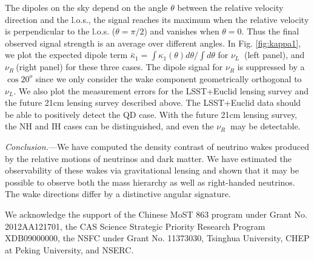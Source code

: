 \documentclass[aps,prl,twocolumn,showpacs,superscriptaddress,groupedaddress,nofootinbib]{revtex4}  %
\newcommand{\nur}{\ensuremath{{\nu_R~}}}
\newcommand{\nul}{\ensuremath{{\nu_L~}}}
\begin{document}
The dipoles on the sky depend on the angle $\theta$ between the relative
velocity direction and the l.o.s., the signal reaches its maximum when 
the relative velocity is perpendicular to the l.o.s. ($\theta=\pi/2$) and 
vanishes when $\theta=0$.
Thus the final observed signal strength is 
an average over different angles.
In Fig. \ref{fig:kappa1}, we plot the expected 
dipole term $\bar{\kappa}_1=\int\kappa_1(\theta)d\theta/\int d\theta$ for  \nul 
(left panel),  and \nur (right panel) for these three cases.
The dipole signal for $\nu_R$ is suppressed by a $\cos 20^o$ since we
only consider the wake component geometrically orthogonal to $\nu_L$.
We also plot the measurement errors for the
LSST+Euclid lensing survey and the future 21cm lensing survey described
above. The LSST+Euclid data should be able to positively
detect the QD case. With the future 21cm lensing survey, the
NH and IH cases can be distinguished, and even the \nur 
may be detectable.

{\it Conclusion.}---We have computed the density contrast of neutrino
wakes produced by the relative motions of neutrinos and dark matter.
We have estimated the observability of these wakes via gravitational
lensing and shown that it may be possible to observe both the mass
hierarchy as well as right-handed neutrinos.  The
wake directions
differ by a distinctive angular signature.

We acknowledge the support of the Chinese MoST 863 program under Grant 
No. 2012AA121701, the CAS Science Strategic Priority Research Program 
XDB09000000, the NSFC under Grant No. 11373030, Tsinghua University, 
CHEP at Peking University, and NSERC.



\end{document}
